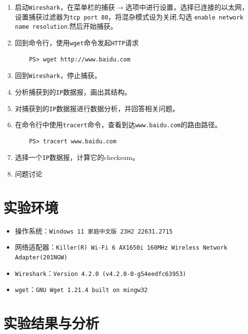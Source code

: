 \documentclass{article}
\begin{document}
\begin{enumerate}[noitemsep, label={{\arabic*})}]
  \item 启动\texttt{Wireshark}，在菜单栏的捕获\(\to \)选项中进行设置，选择已连接的以太网，设置捕获过滤器为\texttt{tcp port 80}，将混杂模式设为关闭,勾选
        \texttt{enable network name resolution}.然后开始捕获。
  \item 回到命令行，使用\texttt{wget}命令发起\texttt{HTTP}请求
        \begin{lstlisting}
    PS> wget http://www.baidu.com
  \end{lstlisting}
  \item 回到\texttt{Wireshark}，停止捕获。
  \item 分析捕获到的\texttt{IP}数据报，画出其结构。
  \item 对捕获到的\texttt{IP}数据报进行数据分析，并回答相关问题。
  \item 在命令行中使用\texttt{tracert}命令，查看到达\texttt{www.baidu.com}的路由路径。

        \begin{lstlisting}
    PS> tracert www.baidu.com
  \end{lstlisting}

  \item 选择一个\texttt{IP}数据报，计算它的checksum。

  \item 问题讨论
\end{enumerate}

\section{实验环境}


\begin{itemize}[noitemsep]
  \item 操作系统：\texttt{Windows 11 家庭中文版 23H2 22631.2715}
  \item 网络适配器：\texttt{Killer(R) Wi-Fi 6 AX1650i 160MHz Wireless Network Adapter(201NGW)}
  \item \texttt{Wireshark}：\texttt{Version 4.2.0 (v4.2.0-0-g54eedfc63953)}
  \item \texttt{wget}：\texttt{GNU Wget 1.21.4 built on mingw32}
\end{itemize}


\section{实验结果与分析}
\end{document}
